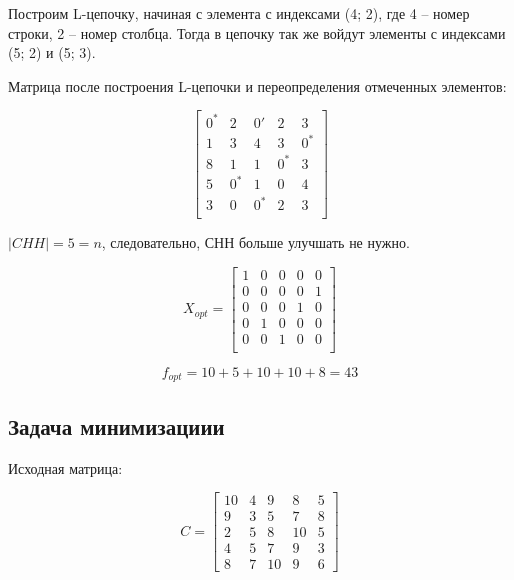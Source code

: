 \documentclass[a4paper,14pt]{article}
\begin{document}
Построим L-цепочку, начиная с элемента с индексами (4; 2), где 4 -- номер строки, 2 -- номер столбца. Тогда в цепочку так же войдут элементы с индексами (5; 2) и (5; 3).

Матрица после построения L-цепочки и  переопределения отмеченных элементов:

\begin{equation}
\begin{bmatrix}
0^* &	2  & 	0'   &	2   &	3 	\\ 
1  &	3  & 	4   &	3   &	0^* \\
8  &	1  & 	1   &	0^* & 	3 	\\
5  & 	0^* & 	1   &	0   &	4 	\\
3  &	0  & 	0^*  &	2   &	3 	\\
\end{bmatrix}
\end{equation}

$|CHH| = 5 = n$, следовательно, СНН больше улучшать не нужно. 

\begin{equation} X_{opt} = 
\begin{bmatrix}
1  &	0  & 	0   &	0   &	0 	\\ 
0  &	0  & 	0   &	0   &	1   \\
0  &	0  & 	0   &	1   & 	0 	\\
0  & 	1  & 	0   &	0   &	0 	\\
0  &	0  & 	1   &	0   &	0 	\\
\end{bmatrix}
\end{equation}

\begin{equation}
f_{opt} = 10+5+10+10+8=43
\end{equation}

\subsection{Задача минимизациии}

Исходная матрица:

\begin{equation} C=
\begin{bmatrix}
10 & 4 & 9 & 8 & 5\\
9 & 3 & 5 & 7 & 8\\
2 & 5 & 8 & 10 & 5\\
4 & 5 & 7 & 9 & 3\\
8 & 7 & 10 & 9 & 6
\end{bmatrix}
\end{equation}
\end{document}
